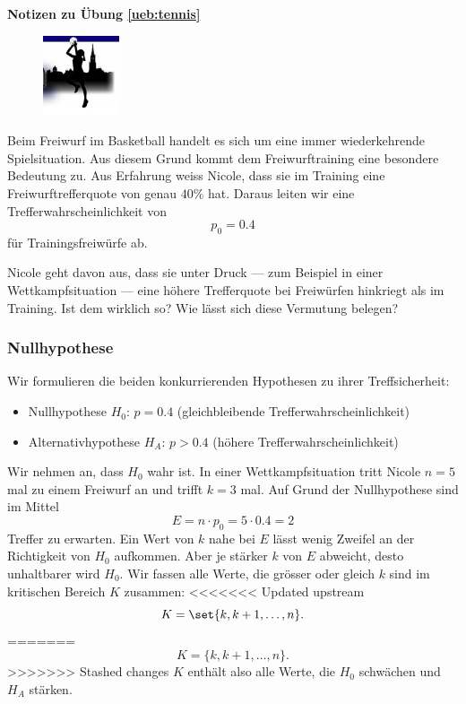 \documentclass[%
<<<<<<< Updated upstream
11pt,%
twoside,%
titlepage,%
german,%
=======
11pt,%
twoside,%
titlepage,%
swissgerman,%
>>>>>>> Stashed changes
headsepline%
]{scrartcl}
\newcommand{\faReturnGray}{\textcolor{gray}{\faMailReply}} %
\theoremstyle{definition}
\theoremstyle{plain}
\newcommand{\concatueb}[1]{ueb:#1}%
\newcommand{\concatlsg}[1]{lsg:#1}%
\newenvironment{lsg}[1]{%
    \par\noindent\textbf{Notizen zu Übung \ref{\concatueb{#1}}}\label{\concatlsg{#1}}
    \hfill\hyperref[\concatueb{#1}]{\faReturnGray}\par %
}{%
    \par%
}
\newcommand{\concatueb}[1]{ueb:#1}%
\newcommand{\concatlsg}[1]{lsg:#1}%
\newenvironment{lsg}[1]{%
    \par\noindent\textbf{Notizen zu Übung \ref{\concatueb{#1}}.}%
    \label{\concatlsg{#1}}
}{%
    \par%
}
\begin{document}
\begin{lsg}{tennis}
\begin{figure}
  \begin{center}
    \includegraphics[width=0.2\textwidth]{pictures/bcfemina}
  \end{center}
\end{figure}

Beim Freiwurf im Basketball handelt es sich um eine immer wiederkehrende Spielsituation. Aus diesem Grund kommt dem Freiwurftraining eine besondere Bedeutung zu. Aus Erfahrung weiss Nicole, dass sie im Training eine Freiwurftrefferquote von genau $40\%$ hat. Daraus leiten wir eine Trefferwahrscheinlichkeit von
$$p_0=0.4$$
für Trainingsfreiwürfe ab.

Nicole geht davon aus, dass sie unter Druck --- zum Beispiel in einer Wettkampfsituation --- eine höhere Trefferquote bei Freiwürfen hinkriegt als im Training. Ist dem wirklich so? Wie lässt sich diese Vermutung belegen?

\subsubsection{Nullhypothese}

Wir formulieren die beiden konkurrierenden Hypothesen zu ihrer Treffsicherheit:

\begin{itemize}
\item Nullhypothese $H_0$: $p=0.4$ (gleichbleibende Trefferwahrscheinlichkeit)
\item Alternativhypothese $H_A$: $p>0.4$ (höhere Trefferwahrscheinlichkeit)
\end{itemize}

Wir nehmen an, dass $H_0$ wahr ist. In einer Wettkampfsituation tritt Nicole $n=5$ mal zu einem Freiwurf an und trifft $k=3$ mal. Auf Grund der Nullhypothese sind im Mittel
$$E=n\cdot p_0=5\cdot0.4=2$$
Treffer zu erwarten. Ein Wert von $k$ nahe bei $E$ lässt wenig Zweifel an der Richtigkeit von $H_0$ aufkommen. Aber je stärker $k$ von $E$ abweicht, desto unhaltbarer wird $H_0$. Wir fassen alle Werte, die grösser oder gleich $k$ sind im kritischen Bereich $K$ zusammen:
<<<<<<< Updated upstream
$$K=\set{k,k+1,\dots,n}.$$
=======
$$K=\{k,k+1,\dots,n\}.$$
>>>>>>> Stashed changes
$K$ enthält also alle Werte, die $H_0$ schwächen und $H_A$ stärken.


\end{lsg}
\end{document}

